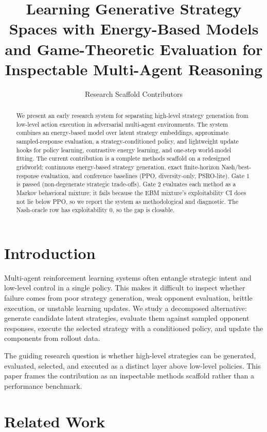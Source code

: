 \documentclass[11pt]{article}
\title{Learning Generative Strategy Spaces with Energy-Based Models and Game-Theoretic Evaluation for Inspectable Multi-Agent Reasoning}
\author{Research Scaffold Contributors}
\date{}
\begin{document}
\maketitle

\begin{abstract}
We present an early research system for separating high-level strategy generation from low-level action execution in adversarial multi-agent environments.
The system combines an energy-based model over latent strategy embeddings, approximate sampled-response evaluation, a strategy-conditioned policy, and lightweight update hooks for policy learning, contrastive energy learning, and one-step world-model fitting.
The current contribution is a complete methods scaffold on a redesigned gridworld: continuous energy-based strategy generation, exact finite-horizon Nash/best-response evaluation, and conference baselines (PPO, diversity-only, PSRO-lite).
Gate 1 is passed (non-degenerate strategic trade-offs). Gate 2 evaluates each method as a Markov behavioral mixture; it fails because the EBM mixture's exploitability CI does not lie below PPO, so we report the system as methodological and diagnostic. The Nash-oracle row has exploitability $0$, so the gap is closable.
\end{abstract}

\section{Introduction}

Multi-agent reinforcement learning systems often entangle strategic intent and low-level control in a single policy.
This makes it difficult to inspect whether failure comes from poor strategy generation, weak opponent evaluation, brittle execution, or unstable learning updates.
We study a decomposed alternative: generate candidate latent strategies, evaluate them against sampled opponent responses, execute the selected strategy with a conditioned policy, and update the components from rollout data.

The guiding research question is whether high-level strategies can be generated, evaluated, selected, and executed as a distinct layer above low-level policies.
This paper frames the contribution as an inspectable methods scaffold rather than a performance benchmark.

\section{Related Work}
\end{document}
